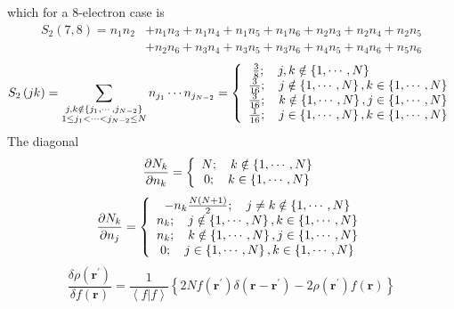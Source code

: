 \documentclass[aps,preprint]{revtex4}%
\begin{document}
which for a $8$-electron case is
\begin{align}
S_{2}\left(  7,8\right)  =n_{1}n_{2}  &  +n_{1}n_{3}+n_{1}n_{4}+n_{1}%
n_{5}+n_{1}n_{6}+n_{2}n_{3}+n_{2}n_{4}+n_{2}n_{5}\\
&  +n_{2}n_{6}+n_{3}n_{4}+n_{3}n_{5}+n_{3}n_{6}+n_{4}n_{5}+n_{4}n_{6}%
+n_{5}n_{6}%
\end{align}%
\begin{equation}
S_{2}\left(  jk\right)  =\sum_{\substack{j,k\notin\left\{  j_{1}%
,\cdots,j_{N-2}\right\}  \\1\leq j_{1}<\cdots<j_{N-2}\leq N}}n_{j_{1}}\cdots
n_{j_{N-2}}=\left\{
\begin{array}
[c]{c}%
\frac{3}{8};\quad j,k\notin\left\{  1,\cdots,N\right\}  \qquad\qquad\qquad\\
\frac{3}{16};\quad j\notin\left\{  1,\cdots,N\right\}  ,k\in\left\{
1,\cdots,N\right\} \\
\frac{3}{16};\quad k\notin\left\{  1,\cdots,N\right\}  ,j\in\left\{
1,\cdots,N\right\} \\
\frac{1}{16};\quad j\in\left\{  1,\cdots,N\right\}  ,k\in\left\{
1,\cdots,N\right\}
\end{array}
\right.
\end{equation}
The diagonal
\begin{equation}
\frac{\partial N_{k}}{\partial n_{k}}=\left\{
\begin{array}
[c]{c}%
N;\quad k\notin\left\{  1,\cdots,N\right\} \\
0;\quad k\in\left\{  1,\cdots,N\right\}
\end{array}
\right.
\end{equation}%
\begin{equation}
\frac{\partial N_{k}}{\partial n_{j}}=\left\{
\begin{array}
[c]{c}%
-n_{k}\frac{N\left(  N+1\right)  }{2};\quad j\neq k\notin\left\{
1,\cdots,N\right\} \\
n_{k};\quad j\notin\left\{  1,\cdots,N\right\}  ,k\in\left\{  1,\cdots
,N\right\} \\
n_{k};\quad k\notin\left\{  1,\cdots,N\right\}  ,j\in\left\{  1,\cdots
,N\right\} \\
0;\quad j\in\left\{  1,\cdots,N\right\}  ,k\in\left\{  1,\cdots,N\right\}
\end{array}
\right.
\end{equation}%
\[
\frac{\delta\rho\left(  \boldsymbol{r}^{\prime}\right)  }{\delta f\left(
\boldsymbol{r}\right)  }=\frac{1}{\left\langle f|f\right\rangle }\left\{
2Nf\left(  \boldsymbol{r}^{\prime}\right)  \delta\left(  \boldsymbol{r-r}%
^{\prime}\right)  -2\rho\left(  \boldsymbol{r}^{\prime}\right)  f\left(
\boldsymbol{r}\right)  \right\}
\]%
\end{document}

